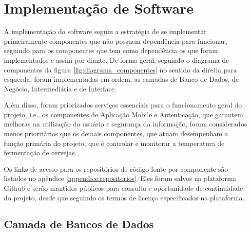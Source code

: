 \section{Implementação de Software}

A implementação do software seguiu a estratégia de se implementar primeiramente componentes que não possuem dependência para funcionar, seguindo para os componentes que tem como dependência os que foram implementados e assim por diante. De forma geral, seguindo o diagrama de componentes da figura \ref{fig:diagrama_componentes} no sentido da direita para esquerda, foram implementadas em ordem, as camadas de Banco de Dados, de Negócio, Intermediária e de Interface. 


Além disso, foram priorizados serviços essenciais para o funcionamento geral do projeto, i.e., os componentes de Aplicação Mobile e Autenticação, que garantem melhoras na utilização do usuário e segurança da informação, foram considerados menos prioritários que os demais componentes, que atuam desempenham a função primária do projeto, que é controlar e monitorar a temperatura de fermentação de cervejas.


Os links de acesso para os repositórios de código fonte por componente são listados no apêndice \ref{appendice:repositorios}. Eles foram salvos na plataforma Github e serão mantidos públicos para consulta e oportunidade de continuidade do projeto, desde que seguindo os termos de licença especificados na plataforma.


\subsection{Camada de Bancos de Dados}



